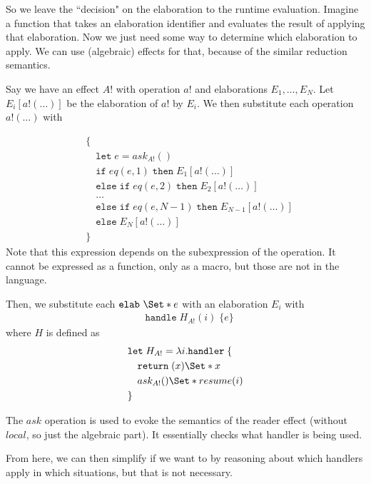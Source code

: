 \documentclass{article}
\newcommand\kw[1]{\mathbf{\mathtt{#1}}\;}
\newcommand\val{\kw{let}}
\newcommand\handler{\kw{handler}}
\newcommand\return[0]{\kw{return}}
\newcommand\handle[2]{\kw{handle} #1\;#2}
\newcommand\elab[2][]{\kw{elab_{#1}}#2}
\renewcommand\S{\Set*}
\begin{document}
So we leave the ``decision" on the elaboration to the runtime evaluation. Imagine a function that takes an elaboration identifier and evaluates the result of applying that elaboration. Now we just need some way to determine which elaboration to apply. We can use (algebraic) effects for that, because of the similar reduction semantics.

Say we have an effect $A!$ with operation $a!$ and elaborations $E_1, \dots, E_N$. Let $E_i[a!(\dots)]$ be the elaboration of $a!$ by $E_i$. We then substitute each operation $a!(\dots)$ with

\begin{align*}
    &\{\\
    &\quad \val e = ask_{A!}()\\
    &\quad \kw{if} eq(e, 1)\;\kw{then} E_1[a!(\dots)]\\
    &\quad \kw{else}\kw{if} eq(e, 2)\;\kw{then} E_2[a!(\dots)]\\
    &\quad \dots\\
    &\quad \kw{else}\kw{if} eq(e, N-1)\;\kw{then} E_{N-1}[a!(\dots)]\\
    &\quad \kw{else} E_N[a!(\dots)]\\
    &\}
\end{align*}
Note that this expression depends on the subexpression of the operation. It cannot be expressed as a function, only as a macro, but those are not in the language.

Then, we substitute each $\elab\S{e}$ with an elaboration $E_i$ with
\begin{align*}
    &\handle{H_{A!}(i)}{\{e\}}
\end{align*}
where $H$ is defined as
\begin{align*}
    &\val H_{A!} =\lambda i. \handler \{\\
    &\quad\return(x) \S{x}\\
    &\quad ask_{A!}() \S{ resume(i) }\\
    &\}\\
\end{align*}

The $ask$ operation is used to evoke the semantics of the reader effect (without $local$, so just the algebraic part). It essentially checks what handler is being used.

From here, we can then simplify if we want to by reasoning about which handlers apply in which situations, but that is not necessary.
\end{document}
